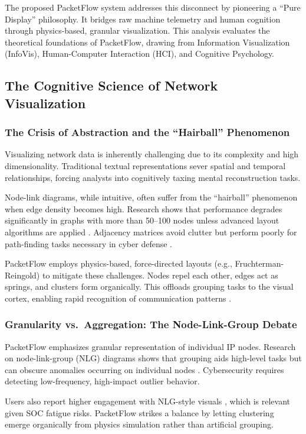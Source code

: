 \documentclass[
    11pt, 
    a4paper, 
    parskip=half, 
    headsepline,       %
    DIV=12             %
]{scrartcl}
\begin{document}
The proposed PacketFlow system addresses this disconnect by pioneering a “Pure Display” philosophy. It bridges raw machine telemetry and human cognition through physics-based, granular visualization. This analysis evaluates the theoretical foundations of PacketFlow, drawing from Information Visualization (InfoVis), Human-Computer Interaction (HCI), and Cognitive Psychology.

\subsection{The Cognitive Science of Network Visualization}

\subsubsection{The Crisis of Abstraction and the ``Hairball'' Phenomenon}
Visualizing network data is inherently challenging due to its complexity and high dimensionality. Traditional textual representations sever spatial and temporal relationships, forcing analysts into cognitively taxing mental reconstruction tasks.

Node-link diagrams, while intuitive, often suffer from the ``hairball'' phenomenon when edge density becomes high. Research shows that performance degrades significantly in graphs with more than 50--100 nodes unless advanced layout algorithms are applied \cite{ref2}. Adjacency matrices avoid clutter but perform poorly for path-finding tasks necessary in cyber defense \cite{ref3}.

PacketFlow employs physics-based, force-directed layouts (e.g., Fruchterman-Reingold) to mitigate these challenges. Nodes repel each other, edges act as springs, and clusters form organically. This offloads grouping tasks to the visual cortex, enabling rapid recognition of communication patterns \cite{ref5}.

\subsubsection{Granularity vs.\ Aggregation: The Node-Link-Group Debate}
PacketFlow emphasizes granular representation of individual IP nodes. Research on node-link-group (NLG) diagrams shows that grouping aids high-level tasks but can obscure anomalies occurring on individual nodes \cite{ref6}. Cybersecurity requires detecting low-frequency, high-impact outlier behavior.

Users also report higher engagement with NLG-style visuals \cite{ref7}, which is relevant given SOC fatigue risks. PacketFlow strikes a balance by letting clustering emerge organically from physics simulation rather than artificial grouping.
\end{document}

